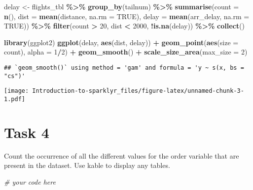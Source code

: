 \documentclass[
]{article}
\newenvironment{Shaded}{\begin{snugshade}}{\end{snugshade}}
\newcommand{\AttributeTok}[1]{\textcolor[rgb]{0.13,0.29,0.53}{#1}}
\newcommand{\CommentTok}[1]{\textcolor[rgb]{0.56,0.35,0.01}{\textit{#1}}}
\newcommand{\ConstantTok}[1]{\textcolor[rgb]{0.56,0.35,0.01}{#1}}
\newcommand{\DecValTok}[1]{\textcolor[rgb]{0.00,0.00,0.81}{#1}}
\newcommand{\FunctionTok}[1]{\textcolor[rgb]{0.13,0.29,0.53}{\textbf{#1}}}
\newcommand{\NormalTok}[1]{#1}
\newcommand{\OtherTok}[1]{\textcolor[rgb]{0.56,0.35,0.01}{#1}}
\newcommand{\SpecialCharTok}[1]{\textcolor[rgb]{0.81,0.36,0.00}{\textbf{#1}}}
\begin{document}
\begin{Shaded}
\begin{Highlighting}[]
\NormalTok{delay }\OtherTok{\textless{}{-}}\NormalTok{ flights\_tbl }\SpecialCharTok{\%\textgreater{}\%} 
  \FunctionTok{group\_by}\NormalTok{(tailnum) }\SpecialCharTok{\%\textgreater{}\%}
  \FunctionTok{summarise}\NormalTok{(}\AttributeTok{count =} \FunctionTok{n}\NormalTok{(), }\AttributeTok{dist =} \FunctionTok{mean}\NormalTok{(distance, }\AttributeTok{na.rm =} \ConstantTok{TRUE}\NormalTok{), }\AttributeTok{delay =} \FunctionTok{mean}\NormalTok{(arr\_delay, }\AttributeTok{na.rm =} \ConstantTok{TRUE}\NormalTok{)) }\SpecialCharTok{\%\textgreater{}\%}
  \FunctionTok{filter}\NormalTok{(count }\SpecialCharTok{\textgreater{}} \DecValTok{20}\NormalTok{, dist }\SpecialCharTok{\textless{}} \DecValTok{2000}\NormalTok{, }\SpecialCharTok{!}\FunctionTok{is.na}\NormalTok{(delay)) }\SpecialCharTok{\%\textgreater{}\%}
  \FunctionTok{collect}\NormalTok{()}

\FunctionTok{library}\NormalTok{(ggplot2)}
\FunctionTok{ggplot}\NormalTok{(delay, }\FunctionTok{aes}\NormalTok{(dist, delay)) }\SpecialCharTok{+}
  \FunctionTok{geom\_point}\NormalTok{(}\FunctionTok{aes}\NormalTok{(}\AttributeTok{size =}\NormalTok{ count), }\AttributeTok{alpha =} \DecValTok{1}\SpecialCharTok{/}\DecValTok{2}\NormalTok{) }\SpecialCharTok{+}
  \FunctionTok{geom\_smooth}\NormalTok{() }\SpecialCharTok{+}
  \FunctionTok{scale\_size\_area}\NormalTok{(}\AttributeTok{max\_size =} \DecValTok{2}\NormalTok{)}
\end{Highlighting}
\end{Shaded}

\begin{verbatim}
## `geom_smooth()` using method = 'gam' and formula = 'y ~ s(x, bs = "cs")'
\end{verbatim}

\texttt{[image: Introduction-to-sparklyr\_files/figure-latex/unnamed-chunk-3-1.pdf]}

\section{Task 4}\label{task-4}

Count the occurrence of all the different values for the order variable
that are present in the dataset. Use kable to display any tables.

\begin{Shaded}
\begin{Highlighting}[]
\CommentTok{\# your code here}
\end{Highlighting}
\end{Shaded}
\end{document}
